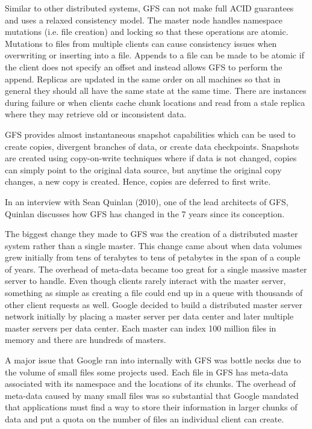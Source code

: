 \documentclass[]{article}
\begin{document}
Similar to other distributed systems, GFS can not make full ACID guarantees and uses a relaxed consistency model. The master node handles namespace mutations (i.e. file creation) and locking so that these operations are atomic. Mutations to files from multiple clients can cause consistency issues when overwriting or inserting into a file. Appends to a file can be made to be atomic if the client does not specify an offset and instead allows GFS to perform the append. Replicas are updated in the same order on all machines so that in general they should all have the same state at the same time. There are instances during failure or when clients cache chunk locations and read from a stale replica where they may retrieve old or inconsistent data. 

GFS provides almost instantaneous snapshot capabilities which can be used to create copies, divergent branches of data, or create data checkpoints. Snapshots are created using copy-on-write techniques where if data is not changed, copies can simply point to the original data source, but anytime the original copy changes, a new copy is created. Hence, copies are deferred to first write. 

In an interview with Sean Quinlan\cite{mckusick_gfs:_2010} (2010), one of the lead architects of GFS, Quinlan discusses how GFS has changed in the 7 years since its conception. 

The biggest change they made to GFS was the creation of a distributed master system rather than a single master. This change came about when data volumes grew initially from tens of terabytes to tens of petabytes in the span of a couple of years. The overhead of meta-data became too great for a single massive master server to handle. Even though clients rarely interact with the master server, something as simple as creating a file could end up in a queue with thousands of other client requests as well. Google decided to build a distributed master server network initially by placing a master server per data center and later multiple master servers per data center. Each master can index 100 million files in memory and there are hundreds of masters.

A major issue that Google ran into internally with GFS was bottle necks due to the volume of small files some projects used. Each file in GFS has meta-data associated with its namespace and the locations of its chunks. The overhead of meta-data caused by many small files was so substantial that Google mandated that applications must find a way to store their information in larger chunks of data and put a quota on the number of files an individual client can create.
\end{document}
